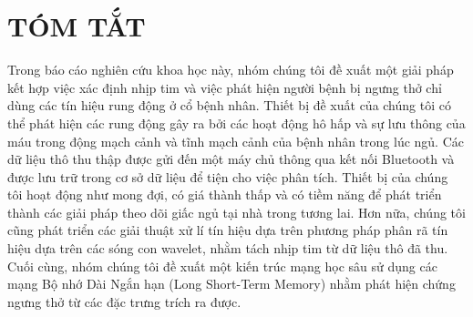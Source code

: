 \chapter*{TÓM TẮT}

Trong báo cáo nghiên cứu khoa học này, nhóm chúng tôi đề xuất một giải pháp kết hợp việc xác định nhịp tim và việc phát hiện người bệnh bị ngưng thở chỉ dùng các tín hiệu rung động ở cổ bệnh nhân. Thiết bị đề xuất của chúng tôi có thể phát hiện các rung động gây ra bởi các hoạt động hô hấp và sự lưu thông của máu trong động mạch cảnh và tĩnh mạch cảnh của bệnh nhân trong lúc ngủ. Các dữ liệu thô thu thập được gửi đến một máy chủ thông qua kết nối Bluetooth và được lưu trữ trong cơ sở dữ liệu để tiện cho việc phân tích. Thiết bị của chúng tôi hoạt động như mong đợi, có giá thành thấp và có tiềm năng để phát triển thành các giải pháp theo dõi giấc ngủ tại nhà trong tương lai. Hơn nữa, chúng tôi cũng phát triển các giải thuật xử lí tín hiệu dựa trên phương pháp phân rã tín hiệu dựa trên các sóng con wavelet, nhằm tách nhịp tim từ dữ liệu thô đã thu. Cuối cùng, nhóm chúng tôi đề xuất một kiến trúc mạng học sâu sử dụng các mạng Bộ nhớ Dài Ngắn hạn (Long Short-Term Memory) nhằm phát hiện chứng ngưng thở từ các đặc trưng trích ra được. 

\newpage